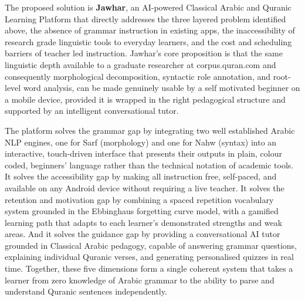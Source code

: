 \documentclass[A4paper,12pt]{article}
\begin{document}
The proposed solution is \textbf{Jawhar}, an AI-powered Classical Arabic and Quranic Learning Platform that directly addresses the three layered problem identified above, the absence of grammar instruction in existing apps, the inaccessibility of research grade linguistic tools to everyday learners, and the cost and scheduling barriers of teacher led instruction. Jawhar's core proposition is that the same linguistic depth available to a graduate researcher at corpus.quran.com and consequently morphological decomposition, syntactic role annotation, and root-level word analysis, can be made genuinely usable by a self motivated beginner on a mobile device, provided it is wrapped in the right pedagogical structure and supported by an intelligent conversational tutor.

The platform solves the grammar gap by integrating two well established Arabic NLP engines, one for Sarf (morphology) and one for Nahw (syntax)  into an interactive, touch-driven interface that presents their outputs in plain, colour coded, beginners' language rather than the technical notation of academic tools. It solves the accessibility gap by making all instruction free, self-paced, and available on any Android device without requiring a live teacher. It solves the retention and motivation gap by combining a spaced repetition vocabulary system grounded in the Ebbinghaus forgetting curve model, with a gamified learning path that adapts to each learner's demonstrated strengths and weak areas. And it solves the guidance gap by providing a conversational AI tutor grounded in Classical Arabic pedagogy, capable of answering grammar questions, explaining individual Quranic verses, and generating personalised quizzes in real time. Together, these five dimensions form a single coherent system that takes a learner from zero knowledge of Arabic grammar to the ability to parse and understand Quranic sentences independently.
\end{document}
